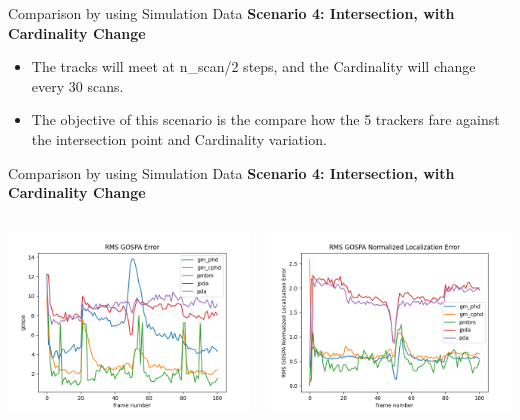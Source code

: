\documentclass[12pt]{beamer}
\let\olditem\item
\renewcommand\item{\olditem\justifying}
\begin{document}
\begin{frame}{Comparison by using Simulation Data}
\textbf{Scenario 4: Intersection, with Cardinality Change}
	\begin{itemize}
		    \item The tracks will meet at n\_scan/2 steps, and the Cardinality will change every 30 scans. 
		    \item The objective of this scenario is the compare how the 5 trackers fare against the intersection point and Cardinality variation. 
	\end{itemize}
\end{frame}

\begin{frame}{Comparison by using Simulation Data}
\textbf{Scenario 4: Intersection, with Cardinality Change}
\begin{columns}[t]
  \begin{column}{0.5\linewidth}
      \centering
      \includegraphics[width=\linewidth,height=\textheight,keepaspectratio]{real_data/scenario4/gospa.png}\\
  \end{column}
    \begin{column}{0.5\linewidth}
      \centering
      \includegraphics[width=\linewidth,height=\textheight,keepaspectratio]{real_data/scenario4/gospa_localization.png}\\

\end{column}
\end{columns}
\end{frame}
\end{document}
